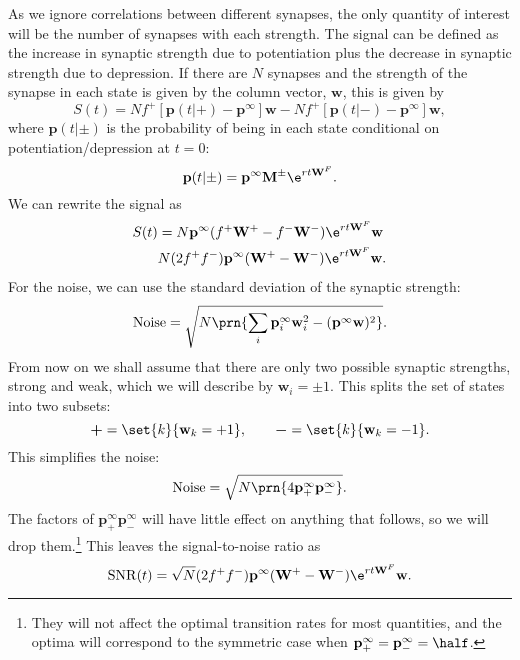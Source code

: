 \documentclass[12pt]{article}
\newcommand{\eq}{\mathbf{p}^\infty}
\newcommand{\w}{\mathbf{w}}
\newcommand{\W}{\mathbf{W}}
\newcommand{\M}{\mathbf{M}}
\DeclareMathOperator{\SNR}{SNR}
\begin{document}
As we ignore correlations between different synapses, the only quantity of interest will be the number of synapses with each strength.
The signal can be defined as the increase in synaptic strength due to potentiation plus the decrease in synaptic strength due to depression.
If there are $N$ synapses and the strength of the synapse in each state is given by the column vector, $\w$, this is given by
%
\begin{equation}\label{eq:signal}
  S(t) = N f^+ [\mathbf{p}(t|+)-\eq]\w - N f^+ [\mathbf{p}(t|-)-\eq]\w,
\end{equation}
%
where $\mathbf{p}(t|\pm)$ is the probability of being in each state conditional on potentiation/depression at $t=0$:
%
\begin{equation}\label{eq:initprob}
  \mathbf{p}(t|\pm) = \eq\M^\pm \e^{rt\W^F}.
\end{equation}
%
We can rewrite the signal as
%
\begin{equation}\label{eq:signalr}
\begin{aligned}
  S(t) &= N \eq (f^+\W^+ - f^-\W^-)\e^{rt\W^F}\w\\
    & N (2f^+f^-) \eq (\W^+ - \W^-)\e^{rt\W^F}\w.
\end{aligned}
\end{equation}
%
For the noise, we can use the standard deviation of the synaptic strength:
%
\begin{equation}\label{eq:noise}
  \text{Noise} = \sqrt{N \prn{\sum_i \eq_i\w_i^2 - (\eq\w)^2}}.
\end{equation}
%
From now on we shall assume that there are only two possible synaptic strengths, strong and weak, which we will describe by $\w_i=\pm1$. This splits the set of states into two subsets:
%
\begin{equation}\label{eq:plusminusstates}
  \boldsymbol{+} = \set{k}{\w_k=+1},
  \qquad
  \boldsymbol{-} = \set{k}{\w_k=-1}.
\end{equation}
%
This simplifies the noise:
%
\begin{equation}\label{eq:noisepm}
  \text{Noise} = \sqrt{N \prn{4\eq_+\eq_-}}.
\end{equation}
%
The factors of $\eq_+\eq_-$ will have little effect on anything that follows, so we will drop them.\footnote{They will not affect the optimal transition rates for most quantities, and the optima will correspond to the symmetric case when $\eq_+=\eq_-=\half$.} This leaves the signal-to-noise ratio as
%
\begin{equation}\label{eq:SNRcurve}
  \SNR(t) = \sqrt{N} (2f^+f^-) \eq (\W^+ - \W^-)\e^{rt\W^F}\w.
\end{equation}
%
\end{document}
